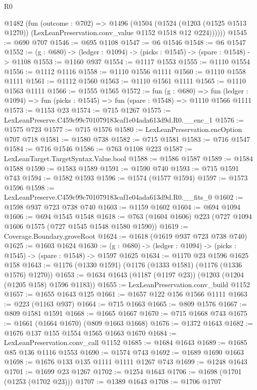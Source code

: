 \begin{lexlean}{R0}
\begin{coremodule}
      @1482
        (fun (outcome : @702) =>
        @1496
          (@1504
            (@1524
              (@1203 (@1525 @1513 @1270))
              (LexLeanPreservation.conv_value @1152 @1518 @12 @224))))))
@1545 := @690 @707
@1546 := @695 @1108
@1547 := @6 @1546
@1548 := @6 @1547
@1552 := (g : @680) -> (ledger : @1094) -> (picks : @1545) -> (spare : @1548) -> @1108
@1553 := @1160 @937
@1554 := @1117 @1553
@1555 := @1110 @1554
@1556 := @1112 @1116
@1558 := @1110 @1556 @1111
@1560 := @1110 @1558 @1111
@1561 := @1112 @1560
@1563 := @1110 @1561 @1111
@1565 := @1110 @1563 @1111
@1566 := @1555 @1565
@1572 := fun (g : @680) =>
  fun (ledger : @1094) => fun (picks : @1545) => fun (spare : @1548) => @1110 @1566 @1111
@1573 := @1153 @23
@1574 := @715 @1267
@1575 := LexLeanPreserve.C459c99c701079183caf1e04ada613d9d.R0.__enc_1
@1576 := @1575 @723
@1577 := @715 @1576
@1580 := LexLeanPreservation.encOption @707 @718
@1581 := @1580 @738
@1582 := @715 @1581
@1583 := @716 @1547
@1584 := @716 @1546
@1586 := @763 @1108 @223
@1587 := LexLeanTarget.TargetSyntax.Value.bool
@1588 := @1586 @1587
@1589 := @1584 @1588
@1590 := @1583 @1589
@1591 := @1590 @740
@1593 := @715 @1591 @743
@1594 := @1582 @1593
@1596 := @1574 (@1577 @1594)
@1597 := @1573 @1596
@1598 := LexLeanPreserve.C459c99c701079183caf1e04ada613d9d.R0.__fits_0
@1602 := @1598 @937 @723 @738 @740
@1603 := @1159 @1602
@1604 := @694 @1094
@1606 := @694 @1545 @1548
@1618 := @763 (@1604 @1606) @223 (@727 @1094 @1606 @1575 (@727 @1545 @1548 @1580 @1590))
@1619 := Coverage.Boundary.groveRoot
@1624 := @1618 (@1619 @937 @723 @738 @740)
@1625 := @1603 @1624
@1630 := (g : @680) -> (ledger : @1094) -> (picks : @1545) -> (spare : @1548) -> @1597 @1625
@1634 := @1170 @23 @1596 @1625 @158
@1643 := @1176 (@1330 @1591) (@1176 (@1333 @1581) (@1176 (@1336 @1576) @1270))
@1653 := @1634 @1643 (@1187 (@1197 @23)) (@1203 (@1204 (@1205 @158) @1596 @1183))
@1655 := LexLeanPreservation.conv_build @1152
@1657 := @1655 @1643 @125
@1661 := @1657 @122 @156 @1566 @1111
@1663 := @223 (@1163 @937)
@1664 := @715 @1663
@1665 := @809 @1576
@1667 := @809 @1581 @1591
@1668 := @1665 @1667
@1670 := @715 @1668 @743
@1675 := @1661 (@1664 @1670) (@809 @1663 @1668)
@1676 := @1372 @1643
@1682 := @1676 @137 @155 @1554 @1565 @1663 @1670
@1684 := LexLeanPreservation.conv_call @1152
@1685 := @1684 @1643
@1689 := @1685 @85 @136 @1116 @1553
@1690 := @1574 @743
@1692 := @1689 @1690 @1663
@1698 := @1676 @133 @135 @1111 @1111 @1267 @743
@1699 := @1248 @1643
@1701 := @1699 @23 @1267
@1702 := @1254 @1643
@1706 := @1698 (@1701 (@1253 (@1702 @23)))
@1707 := @1389 @1643
@1708 := @1706 @1707

\end{coremodule}
\end{lexlean}
